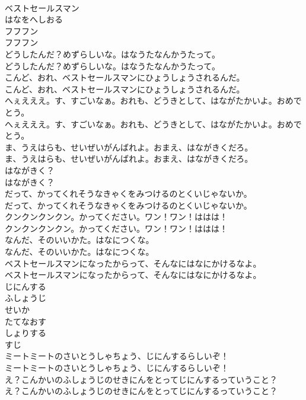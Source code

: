 \documentclass[8pt]{extreport}
\begin{document}
\begin{CJK}{UTF8}{min}
\\	ベストセールスマン
\\	はなをへしおる
\\	フフフン
\\	フフフン
\\	どうしたんだ？めずらしいな。はなうたなんかうたって。
\\	どうしたんだ？めずらしいな。はなうたなんかうたって。
\\	こんど、おれ、ベストセールスマンにひょうしょうされるんだ。
\\	こんど、おれ、ベストセールスマンにひょうしょうされるんだ。
\\	へぇえええ。す、すごいなぁ。おれも、どうきとして、はながたかいよ。おめでとう。
\\	へぇえええ。す、すごいなぁ。おれも、どうきとして、はながたかいよ。おめでとう。
\\	ま、うえはらも、せいぜいがんばれよ。おまえ、はながきくだろ。
\\	ま、うえはらも、せいぜいがんばれよ。おまえ、はながきくだろ。
\\	はながきく？
\\	はながきく？
\\	だって、かってくれそうなきゃくをみつけるのとくいじゃないか。
\\	だって、かってくれそうなきゃくをみつけるのとくいじゃないか。
\\	クンクンクンクン。かってください。ワン！ワン！ははは！
\\	クンクンクンクン。かってください。ワン！ワン！ははは！
\\	なんだ、そのいいかた。はなにつくな。
\\	なんだ、そのいいかた。はなにつくな。
\\	ベストセールスマンになったからって、そんなにはなにかけるなよ。
\\	ベストセールスマンになったからって、そんなにはなにかけるなよ。
\\	じにんする
\\	ふしょうじ
\\	せいか
\\	たてなおす
\\	しょりする
\\	すじ
\\	ミートミートのさいとうしゃちょう、じにんするらしいぞ！
\\	ミートミートのさいとうしゃちょう、じにんするらしいぞ！
\\	え？こんかいのふしょうじのせきにんをとってじにんするっていうこと？
\\	え？こんかいのふしょうじのせきにんをとってじにんするっていうこと？

\end{CJK}
\end{document}
